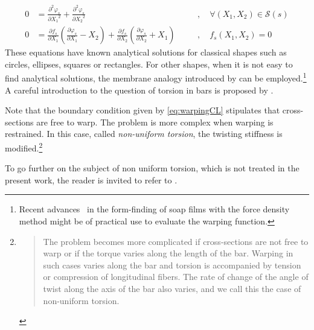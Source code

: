 \begin{subequations}
	\begin{alignat}{5}
	0 &= \frac{\partial^2 \varphi_s}{\partial {X_1}^2} + \frac{\partial^2 \varphi_s}{\partial {X_2}^2}
	&&  \quad, \quad \forall (X_1,X_2)\in\mathcal{S}(s)
	\\[0.5em]
	0 &= \frac{\partial f_s}{\partial {X_1}}\left(\frac{\partial \varphi_s}{\partial {X_1}} - X_2 \right)
	+ \frac{\partial f_s}{\partial {X_2}}\left(\frac{\partial \varphi_s}{\partial {X_2}} + X_1 \right)
	&& \quad, \quad f_s(X_1,X_2) = 0 \label{eq:warpingCL}
	\end{alignat}
\end{subequations}
These equations have known analytical solutions for classical shapes such as circles, ellipses, squares or rectangles. For other shapes, when it is not easy to find analytical solutions, the membrane analogy introduced by  can be employed.\footnote{Recent advances~\cite{Koohestani2014} in the form-finding of soap films with the force density method might be of practical use to evaluate the warping function.} A careful introduction to the question of torsion in bars is proposed by .

Note that the boundary condition given by \cref{eq:warpingCL} stipulates that cross-sections are free to warp. The problem is more complex when warping is restrained. In this case, called \emph{non-uniform torsion}, the twisting stiffness is modified.\footnote{\blockcquote{Timoshenko1945b}{The problem becomes more complicated if cross-sections are not free to warp or if the torque varies along the length of the bar. Warping in such cases varies along the bar and torsion is accompanied by tension or compression of longitudinal fibers. The rate of change of the angle of twist along the axis of the bar also varies, and we call this the case of non-uniform torsion.}.}

To go further on the subject of non uniform torsion, which is not treated in the present work, the reader is invited to refer to \cite{Vlasov1961,Elter1984,Alves2014}.

